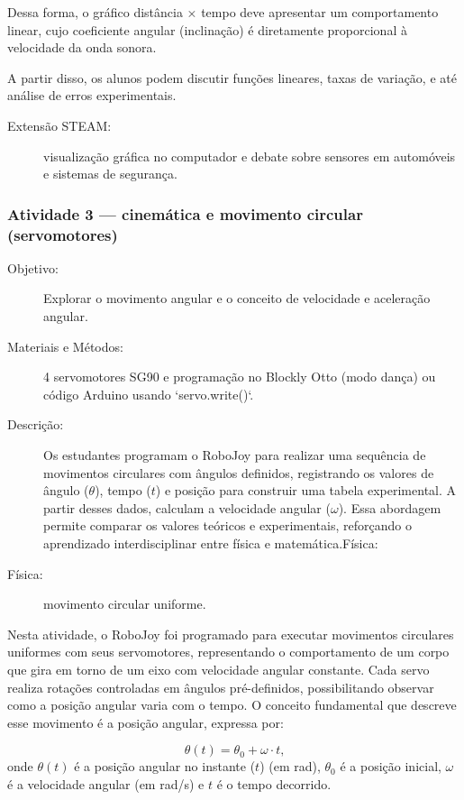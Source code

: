 \documentclass[portuguese]{textolivre}
\begin{document}
Dessa forma, o gráfico distância × tempo deve apresentar um comportamento linear, cujo coeficiente angular (inclinação) é diretamente proporcional à velocidade da onda sonora.

A partir disso, os alunos podem discutir funções lineares, taxas de variação, e até análise de erros experimentais.

\begin{description}
    \item[Extensão STEAM:] visualização gráfica no computador e debate sobre sensores em automóveis e sistemas de segurança.
\end{description}


\subsubsection{Atividade 3 — cinemática e movimento circular (servomotores)}

\begin{description}
    \item[Objetivo:] Explorar o movimento angular e o conceito de velocidade e aceleração angular.
    \item[Materiais e Métodos:] 4 servomotores SG90 e programação no Blockly Otto (modo dança) ou código Arduino usando `servo.write()`.
    \item[Descrição:] Os estudantes programam o RoboJoy para realizar uma sequência de movimentos circulares com ângulos definidos, registrando os valores de ângulo ($\theta$), tempo ($t$) e posição para construir uma tabela experimental. A partir desses dados, calculam a velocidade angular ($\omega$). Essa abordagem permite comparar os valores teóricos e experimentais, reforçando o aprendizado interdisciplinar entre física e matemática.Física:
    \item[Física:] movimento circular uniforme.
\end{description}

Nesta atividade, o RoboJoy foi programado para executar movimentos circulares uniformes com seus servomotores, representando o comportamento de um corpo que gira em torno de um eixo com velocidade angular constante. Cada servo realiza rotações controladas em ângulos pré-definidos, possibilitando observar como a posição angular varia com o tempo. O conceito fundamental que descreve esse movimento é a posição angular, expressa por:

\begin{equation}
	\theta(t) = \theta_0 + \omega \cdot t \text{,}
\end{equation}
onde $\theta(t)$ é a posição angular no instante ($t$) (em rad),
$\theta_0$ é a posição inicial,
$\omega$ é a velocidade angular (em rad/s) e $t$ é o tempo decorrido.
\end{document}
